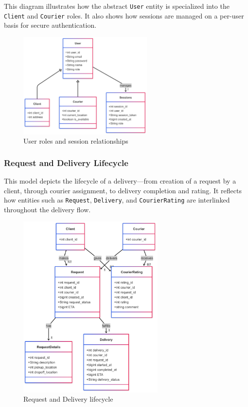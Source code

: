 This diagram illustrates how the abstract \texttt{User} entity is specialized into the \texttt{Client} and \texttt{Courier} roles. It also shows how sessions are managed on a per-user basis for secure authentication.

\begin{figure}[H]
    \centering
    \includegraphics[width=0.60\textwidth]{images/classDiagrams/user_role_hierarchy.png}
    \caption{User roles and session relationships}
\end{figure}

\newpage

\subsubsection{Request and Delivery Lifecycle}

This model depicts the lifecycle of a delivery—from creation of a request by a client, through courier assignment, to delivery completion and rating. It reflects how entities such as \texttt{Request}, \texttt{Delivery}, and \texttt{CourierRating} are interlinked throughout the delivery flow.

\begin{figure}[H]
    \centering
    \includegraphics[width=0.65\textwidth]{images/classDiagrams/request_lifecycle.png}
    \caption{Request and Delivery lifecycle}
\end{figure}

